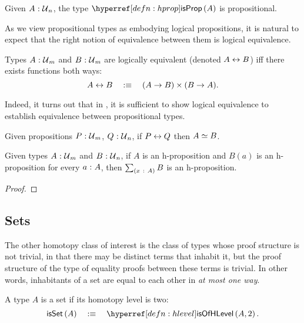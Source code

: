 \begin{prop}
  Given $A\hspace{0.1mm}:\hspace{0.1mm}\mathcal{U}{}_n$, the type $\isprop{A}$ is propositional.
\end{prop}

As we view propositional types as embodying logical propositions, it is natural to
expect that the right notion of equivalence between them is logical equivalence.
\begin{defn}\label{defn:iff}
  Types $A\hspace{0.1mm}:\hspace{0.1mm}\mathcal{U}{}_m$ and $B\hspace{0.1mm}:\hspace{0.1mm}\mathcal{U}{}_m$ are logically equivalent
  (denoted $A \leftrightarrow B$) iff there exists functions both ways:
  \begin{equation*}
    A \leftrightarrow B \quad:\equiv\quad (A \rightarrow B) \times (B \rightarrow A).
  \end{equation*}
\end{defn}
Indeed, it turns out that in \UF{}, it is sufficient to show logical equivalence to
establish equivalence between propositional types.
\begin{prop}\label{prop:iff-equiv}
  Given propositions $P\hspace{0.1mm}:\hspace{0.1mm}\mathcal{U}{}_m$, $Q\hspace{0.1mm}:\hspace{0.1mm}\mathcal{U}{}_n$, if $P \leftrightarrow Q$
  then $A \simeq B$.
\end{prop}

\begin{prop}\label{prop:sigma-prop}
  Given types $A\hspace{0.1mm}:\hspace{0.1mm}\mathcal{U}{}_m$ and $B\hspace{0.1mm}:\hspace{0.1mm}\mathcal{U}{}_n$, if $A$ is an
  h-proposition and $B(a)$ is an h-proposition for every $a\hspace{0.1mm}:\hspace{0.1mm}A$, then
  $\sum_{(x~:~A)} B$ is an h-proposition.
\end{prop}
\begin{proof}
\end{proof}

\subsection{Sets}

The other homotopy class of interest is the class of types whose proof structure is not
trivial, in that there may be distinct terms that inhabit it, but the proof structure of
the type of equality proofs between these terms is trivial. In other words, inhabitants of
a set are equal to each other in \emph{at most one way}.
\begin{defn}[Set]\label{defn:hset}
  A type $A$ is a set if its homotopy level is two:
  \begin{equation*}
    \isset{A} \quad\is\quad \isofhlevel{A}{2}.
  \end{equation*}
\end{defn}

